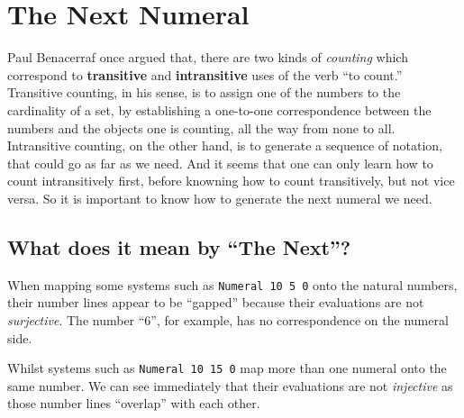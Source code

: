\documentclass[\main/thesis.tex]{subfiles}
\begin{document}
\section{The Next Numeral}\label{next}

Paul Benacerraf once argued\cite{benacerraf1965numbers} that, there are two kinds
of \textit{counting} which correspond to \textbf{transitive} and \textbf{intransitive}
uses of the verb ``to count.'' Transitive counting, in his sense, is to assign one
of the numbers to the cardinality of a set, by establishing a one-to-one correspondence
between the numbers and the objects one is counting, all the way from none to
all. Intransitive counting, on the other hand, is to generate a sequence of
notation, that could go as far as we need. And it seems that one can only learn
how to count intransitively first, before knowning how to count transitively,
but not vice versa. So it is important to know how to generate the next numeral
we need.

\subsection{What does it mean by ``The Next''?}

When mapping some systems such as {\lstinline|Numeral 10 5 0|} onto
the natural numbers, their number lines appear to be ``gapped'' because their
evaluations are not \textit{surjective}.
The number ``6'', for example, has no correspondence on the numeral side.

\begin{center}
    \begin{adjustbox}{max width=\textwidth}
    \end{adjustbox}
\end{center}

Whilst systems such as {\lstinline|Numeral 10 15 0|} map more than one numeral
onto the same number. We can see immediately that their evaluations are not
\textit{injective} as those number lines ``overlap'' with each other.
\end{document}
